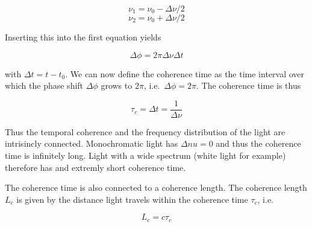 \documentclass[
  a4paper,
]{book}
\begin{document}
\[
\nu_1=\nu_0-\Delta \nu/2
\] \[
\nu_2=\nu_0+\Delta \nu/2
\]

Inserting this into the first equation yields

\[
\Delta \phi = 2\pi \Delta \nu \Delta t
\]

with \(\Delta t=t-t_0\). We can now define the coherence time as the
time interval over which the phase shift \(\Delta \phi\) grows to
\(2\pi\), i.e.~\(\Delta \phi=2\pi\). The coherence time is thus

\[
\tau_{c}=\Delta t =\frac{1}{\Delta \nu}
\]

Thus the temporal coherence and the frequency distribution of the light
are intrisincly connected. Monochromatic light has \(\Delta nu=0\) and
thus the coherence time is infinitely long. Light with a wide spectrum
(white light for example) therefore has and extremly short coherence
time.

The coherence time is also connected to a coherence length. The
coherence length \(L_c\) is given by the distance light travels within
the coherence time \(\tau_c\), i.e.

\[
L_c=c\tau_c
\]
\end{document}
